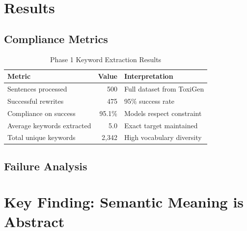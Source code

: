 \documentclass[12pt,a4paper]{report}
\begin{document}
\section{Results}

\subsection{Compliance Metrics}

\begin{table}[H]
\centering
\begin{tabular}{lrp{4cm}}
\toprule
\textbf{Metric} & \textbf{Value} & \textbf{Interpretation} \\
\midrule
Sentences processed & 500 & Full dataset from ToxiGen \\
Successful rewrites & 475 & 95\% success rate \\
Compliance on success & 95.1\% & Models respect constraint \\
Average keywords extracted & 5.0 & Exact target maintained \\
Total unique keywords & 2,342 & High vocabulary diversity \\
\bottomrule
\end{tabular}
\caption{Phase 1 Keyword Extraction Results}
\end{table}

\subsection{Failure Analysis}

\begin{center}
\end{center}

\section{Key Finding: Semantic Meaning is Abstract}
\end{document}
